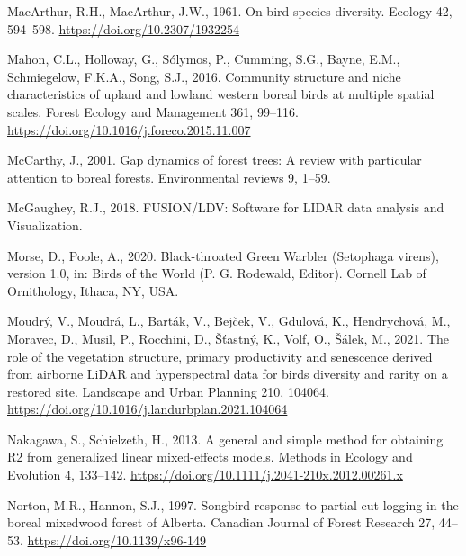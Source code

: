 \documentclass[
]{article}
\newlength{\cslhangindent}
\newlength{\cslentryspacingunit} %
\newenvironment{CSLReferences}[2] %
 {%
  \setlength{\parindent}{0pt}
  \ifodd #1
  \let\oldpar\par
  \def\par{\hangindent=\cslhangindent\oldpar}
  \fi
  \setlength{\parskip}{#2\cslentryspacingunit}
 }%
 {}
\begin{document}
\begin{CSLReferences}{1}{0}
\leavevmode{}%
MacArthur, R.H., MacArthur, J.W., 1961. On bird species diversity. Ecology 42, 594--598. \url{https://doi.org/10.2307/1932254}

\leavevmode{}%
Mahon, C.L., Holloway, G., Sólymos, P., Cumming, S.G., Bayne, E.M., Schmiegelow, F.K.A., Song, S.J., 2016. Community structure and niche characteristics of upland and lowland western boreal birds at multiple spatial scales. Forest Ecology and Management 361, 99--116. \url{https://doi.org/10.1016/j.foreco.2015.11.007}

\leavevmode{}%
McCarthy, J., 2001. Gap dynamics of forest trees: A review with particular attention to boreal forests. Environmental reviews 9, 1--59.

\leavevmode{}%
McGaughey, R.J., 2018. {FUSION}/{LDV}: {Software} for {LIDAR} data analysis and {Visualization}.

\leavevmode{}%
Morse, D., Poole, A., 2020. Black-throated {Green} {Warbler} ({Setophaga} virens), version 1.0, in: Birds of the {World} ({P}. {G}. {Rodewald}, {Editor}). Cornell Lab of Ornithology, Ithaca, NY, USA.

\leavevmode{}%
Moudrý, V., Moudrá, L., Barták, V., Bejček, V., Gdulová, K., Hendrychová, M., Moravec, D., Musil, P., Rocchini, D., Šťastný, K., Volf, O., Šálek, M., 2021. The role of the vegetation structure, primary productivity and senescence derived from airborne {LiDAR} and hyperspectral data for birds diversity and rarity on a restored site. Landscape and Urban Planning 210, 104064. \url{https://doi.org/10.1016/j.landurbplan.2021.104064}

\leavevmode{}%
Nakagawa, S., Schielzeth, H., 2013. A general and simple method for obtaining {R2} from generalized linear mixed-effects models. Methods in Ecology and Evolution 4, 133--142. \url{https://doi.org/10.1111/j.2041-210x.2012.00261.x}

\leavevmode{}%
Norton, M.R., Hannon, S.J., 1997. Songbird response to partial-cut logging in the boreal mixedwood forest of {Alberta}. Canadian Journal of Forest Research 27, 44--53. \url{https://doi.org/10.1139/x96-149}


\end{CSLReferences}
\end{document}
